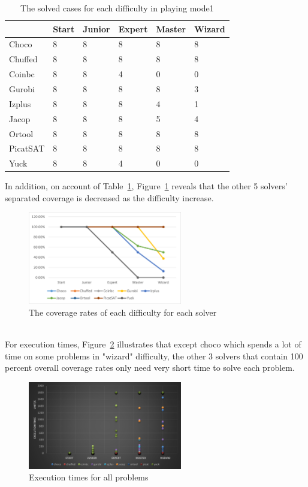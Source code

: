 \begin{table}[htbp]
\centering
\caption{The solved cases for each difficulty in playing mode1}
\label{tab:solvedcaseforeach difficulty1}
\begin{tabular}{|l|l|l|l|l|l|}
\hline
	    &Start	&Junior	&Expert	&Master	&Wizard\\
\hline
Choco	&8	&8	&8	&8	&8\\
\hline
Chuffed	&8	&8	&8	&8	&8\\
\hline
Coinbc	&8	&8	&4	&0	&0\\
\hline
Gurobi	&8	&8	&8	&8	&3\\
\hline
Izplus	&8	&8	&8	&4	&1\\
\hline
Jacop	&8	&8	&8	&5	&4\\
\hline
Ortool	&8	&8	&8	&8	&8\\
\hline
PicatSAT	&8	&8	&8	&8	&8\\
\hline
Yuck	&8	&8	&4	&0	&0\\
\hline
\end{tabular}
\end{table}
In addition, on account of Table~\ref{tab:solvedcaseforeach difficulty1}, Figure~\ref{fig:mode1eva4} reveals that the other 5 solvers' separated coverage is decreased as the difficulty increase. 
\begin{figure}[htbp]
    \centering
    \includegraphics[width=0.6\textwidth]{figs/mode1seperatedcoverage.png}
    \caption{The coverage rates of each difficulty for each solver}
    \label{fig:mode1eva4}
\end{figure}
\\For execution times, Figure~\ref{fig:mode1time1} illustrates that except choco which spends a lot of time on some problems in  "wizard" difficulty, the other 3 solvers that contain 100 percent overall coverage rates only need very short time to solve each problem. 
\begin{figure}[htbp]
\centering
\includegraphics[width=0.6\textwidth]{figs/time1all.png}
\caption{Execution times for all problems}
\label{fig:mode1time1}
\end{figure}
